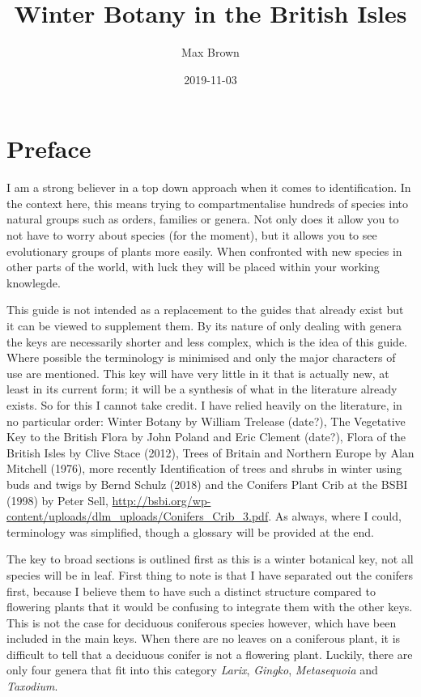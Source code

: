 \documentclass[openany]{book}
\title{Winter Botany in the British Isles}
\author{Max Brown}
\date{2019-11-03}
\begin{document}
\maketitle

{
\setcounter{tocdepth}{1}
\tableofcontents
}
\hypertarget{preface}{%
\chapter*{Preface}\label{preface}}

I am a strong believer in a top down approach when it comes to
identification. In the context here, this means trying to
compartmentalise hundreds of species into natural groups such as orders,
families or genera. Not only does it allow you to not have to worry
about species (for the moment), but it allows you to see evolutionary
groups of plants more easily. When confronted with new species in other
parts of the world, with luck they will be placed within your working
knowlegde.

This guide is not intended as a replacement to the guides that already
exist but it can be viewed to supplement them. By its nature of only
dealing with genera the keys are necessarily shorter and less complex,
which is the idea of this guide. Where possible the terminology is
minimised and only the major characters of use are mentioned. This key
will have very little in it that is actually new, at least in its
current form; it will be a synthesis of what in the literature already
exists. So for this I cannot take credit. I have relied heavily on the
literature, in no particular order: Winter Botany by William Trelease
(date?), The Vegetative Key to the British Flora by John Poland and Eric
Clement (date?), Flora of the British Isles by Clive Stace (2012), Trees
of Britain and Northern Europe by Alan Mitchell (1976), more recently
Identification of trees and shrubs in winter using buds and twigs by
Bernd Schulz (2018) and the Conifers Plant Crib at the BSBI (1998) by
Peter Sell,
\url{http://bsbi.org/wp-content/uploads/dlm_uploads/Conifers_Crib_3.pdf}.
As always, where I could, terminology was simplified, though a glossary
will be provided at the end.

The key to broad sections is outlined first as this is a winter
botanical key, not all species will be in leaf. First thing to note is
that I have separated out the conifers first, because I believe them to
have such a distinct structure compared to flowering plants that it
would be confusing to integrate them with the other keys. This is not
the case for deciduous coniferous species however, which have been
included in the main keys. When there are no leaves on a coniferous
plant, it is difficult to tell that a deciduous conifer is not a
flowering plant. Luckily, there are only four genera that fit into this
category \emph{Larix}, \emph{Gingko}, \emph{Metasequoia} and
\emph{Taxodium}.
\end{document}
